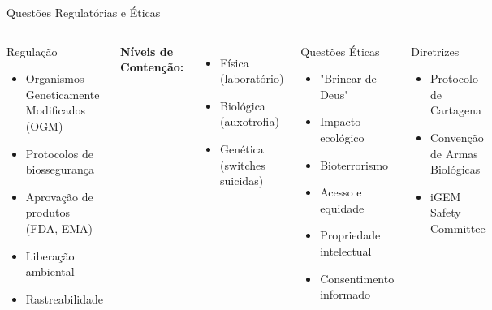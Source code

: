 \begin{frame}{Questões Regulatórias e Éticas}
\begin{columns}
\begin{alertblock}{Regulação}
\begin{itemize}
    \item Organismos Geneticamente Modificados (OGM)
    \item Protocolos de biossegurança
    \item Aprovação de produtos (FDA, EMA)
    \item Liberação ambiental
    \item Rastreabilidade
\end{itemize}
\end{alertblock}

\textbf{Níveis de Contenção:}
\begin{itemize}
    \item Física (laboratório)
    \item Biológica (auxotrofia)
    \item Genética (switches suicidas)
\end{itemize}

\begin{alertblock}{Questões Éticas}
\begin{itemize}
    \item "Brincar de Deus"
    \item Impacto ecológico
    \item Bioterrorismo
    \item Acesso e equidade
    \item Propriedade intelectual
    \item Consentimento informado
\end{itemize}
\end{alertblock}

\begin{exampleblock}{Diretrizes}
\begin{itemize}
    \item Protocolo de Cartagena
    \item Convenção de Armas Biológicas
    \item iGEM Safety Committee
\end{itemize}
\end{exampleblock}
\end{columns}
\end{frame}

